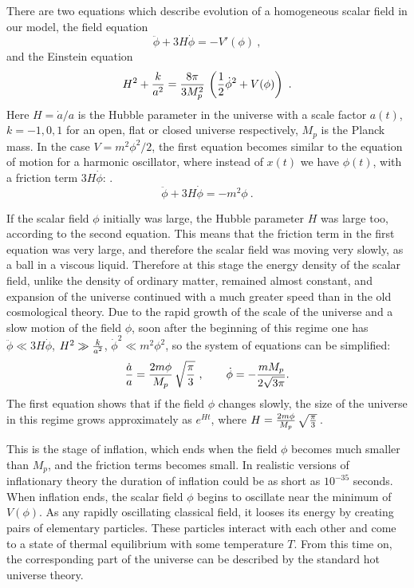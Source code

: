 \documentclass[a4paper,12pt]{article}
\begin{document}
There are  two equations which describe evolution of a homogeneous scalar
field
 in our model, the field equation
\begin{equation}\label{1}
 \ddot\phi + 3H\dot\phi = -{V'(\phi)} \ ,
\end{equation}
and the Einstein equation
\begin{equation}\label{2}
H^2 +{k\over a^2} ={8\pi  \over 3 M_p^2}\, \left(  {1\over 2}\dot \phi
^2+V(\phi) \right) \ .
\end{equation}
Here $H = \dot a/a $ is the Hubble parameter in the universe with a scale
factor $a(t)$, $k = -1, 0, 1$ for an open, flat or closed universe
respectively, $M_p$ is the Planck mass. In the case $V = m^2\phi^2/2$,
the first equation becomes similar to the
 equation of motion for a harmonic oscillator, where instead of $x(t)$ we have
$\phi(t)$,  with a friction term $3H\dot\phi$:   .
\begin{equation}\label{1ax}
\ddot\phi + 3H\dot\phi = -m^2\phi  \ .
\end{equation}



 If   the scalar field $\phi$  initially was large,   the Hubble parameter $H$
was large too, according to the second equation. This means that the
friction term in the first equation was very large, and therefore    the
scalar field was moving   very slowly, as a ball in a viscous liquid.
Therefore at this stage the energy density of the scalar field, unlike
the  density of ordinary matter,   remained almost constant, and
expansion of the universe continued with a much greater speed than in the
old cosmological theory. Due to the rapid growth of the scale of the
universe and a slow motion of the field $\phi$, soon after the beginning
of this regime one has $\ddot\phi \ll 3H\dot\phi$, $H^2 \gg {k\over
a^2}$, $ \dot \phi ^2\ll m^2\phi^2$, so  the system of equations can be
simplified:
\begin{equation}\label{E04}
{\dot a \over a}   ={2
m\phi\over M_p}\, \sqrt { \pi  \over 3}\ , ~~~~~~  \dot\phi = -{m M_p\over 2\sqrt{3\pi}}     .
\end{equation}
The first equation shows that if the field $\phi$ changes slowly, the size of the universe in this regime
grows approximately as $e^{Ht}$, where $H = {2 m\phi\over M_p}\, \sqrt {
\pi  \over 3}\,  $. 

This is the stage of inflation, which ends when the field $\phi$ becomes much smaller than $M_p$, and the friction terms becomes small. In  realistic versions of inflationary theory the  duration of inflation could be as short as $10^{-35}$ seconds. When inflation ends, the
scalar field $\phi$ begins to   oscillate near the minimum of $V(\phi)$.
As any rapidly oscillating classical field, it looses its energy by
creating pairs of elementary particles. These particles interact with
each other and come to a state of thermal equilibrium with some
temperature $T$. From this time on, the corresponding part of the
universe can be described by the standard hot universe theory.
\end{document}
